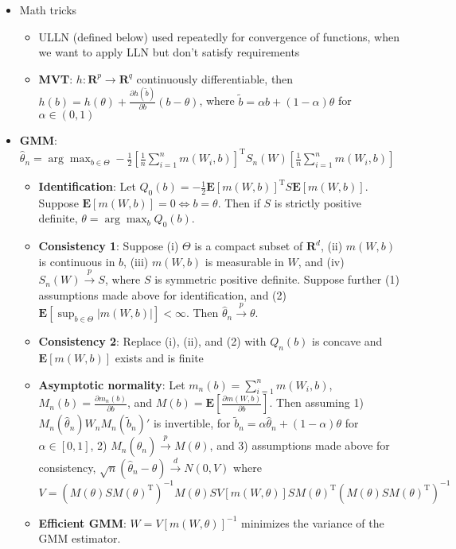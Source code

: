 \documentclass[12pt,english]{article}
\newcommand{\T}{\ensuremath{\text{T}}}
\begin{document}
\begin{itemize}
	\item Math tricks
	\begin{itemize}
		\item ULLN (defined below) used repeatedly for convergence of functions, when we want to apply LLN but don't satisfy requirements
		\item \textbf{MVT}: $h : \mathbf{R}^{p} \to \mathbf{R}^{q}$ continuously differentiable, then $h(b) = h(\theta) + \frac{\partial h(\tilde{b})}{\partial b} (b - \theta)$, where $\tilde{b} = \alpha b + (1 - \alpha) \theta$ for $\alpha \in (0, 1)$
	\end{itemize}
	\item \textbf{GMM}: $\hat{\theta}_{n} = \arg \max_{b \in \Theta} -\frac{1}{2} [\frac{1}{n} \sum_{i=1}^{n} m(W_{i}, b)]^{\T} S_{n}(W) [\frac{1}{n} \sum_{i=1}^{n} m(W_{i}, b)]$
	\begin{itemize}
		\item \textbf{Identification}: Let $Q_{0}(b) = -\frac{1}{2} \mathbf{E}[m(W, b)]^{\T} S \mathbf{E}[m(W, b)]$. Suppose $\mathbf{E}[m(W, b)] = 0 \Leftrightarrow b = \theta$. Then if $S$ is strictly positive definite, $\theta = \arg \max_{b} Q_{0}(b)$.
		\item \textbf{Consistency 1}: Suppose (i) $\Theta$ is a compact subset of $\mathbf{R}^{d}$, (ii) $m(W, b)$ is continuous in $b$, (iii) $m(W, b)$ is measurable in $W$, and (iv) $S_{n}(W) \overset{p}{\to} S$, where $S$ is symmetric positive definite. Suppose further (1) assumptions made above for identification, and (2) $\mathbf{E}[\sup_{b \in \Theta} |m(W, b)|] < \infty$. Then $\hat{\theta}_{n} \overset{p}{\to} \theta$.
		\item \textbf{Consistency 2}: Replace (i), (ii), and (2) with $Q_{n}(b)$ is concave and $\mathbf{E}[m(W, b)]$ exists and is finite
		\item \textbf{Asymptotic normality}: Let $m_{n}(b) = \sum_{i=1}^{n} m(W_{i}, b)$, $M_{n}(b) = \frac{\partial m_{n}(b)}{\partial b}$, and $M(b) = \mathbf{E}[\frac{\partial m(W, b)}{\partial b}]$. Then assuming 1)  $M_{n}(\hat{\theta}_{n}) W_{n} M_{n}(\tilde{b}_{n})'$ is invertible, for $\tilde{b}_{n} = \alpha \hat{\theta}_{n} + (1 - \alpha) \theta$ for $\alpha \in [0, 1]$, 2) $M_{n}(\hat{\theta}_{n}) \overset{p}{\to} M(\theta)$, and 3) assumptions made above for consistency, $\sqrt{n}(\hat{\theta}_{n} - \theta) \overset{d}{\to} N(0, V)$ where $V = (M(\theta)SM(\theta)^{\T})^{-1} M(\theta)SV[m(W, \theta)] SM(\theta)^{\T} (M(\theta)SM(\theta)^{\T})^{-1}$
		\item \textbf{Efficient GMM}: $W = V[m(W, \theta)]^{-1}$ minimizes the variance of the GMM estimator.

\end{itemize}
\end{itemize}
\end{document}
